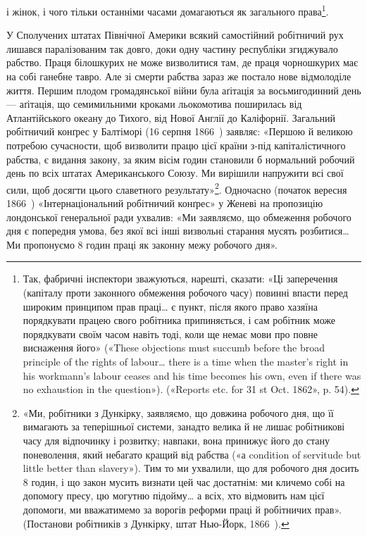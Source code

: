 і жінок, і чого тільки останніми часами домагаються як
загального права\footnote{
Так, фабричні інспектори зважуються, нарешті, сказати: «Ці
заперечення (капіталу проти законного обмеження робочого часу) повинні
впасти перед широким принципом прав праці\dots{} є пункт, після якого право
хазяїна порядкувати працею свого робітника припиняється, і сам робітник
може порядкувати своїм часом навіть тоді, коли ще немає мови про повне
виснаження його» («These objections must succumb before the broad
principle of the rights of labour\dots{} there is a time when the master’s right
in his workmann’s labour ceases and his time becomes his own, even if
there was no exhaustion in the question»). («Reports etc. for 31 st Oct.
1862», p. 54).
}.

У Сполучених штатах Північної Америки всякий самостійний
робітничий рух лишався паралізованим так довго, доки
одну частину республіки згиджувало рабство. Праця білошкурих
не може визволитися там, де праця чорношкурих має на собі
ганебне тавро. Але зі смерти рабства зараз же постало нове відмолоділе
життя. Першим плодом громадянської війни була аґітація
за восьмигодинний день — аґітація, що семимильними
кроками льокомотива поширилась від Атлантійського океану до
Тихого, від Нової Англії до Каліфорнії. Загальний робітничий
конґрес у Балтіморі (16 серпня 1866~) заявляє: «Першою й
великою потребою сучасности, щоб визволити працю цієї країни
з-під капіталістичного рабства, є видання закону, за яким вісім
годин становили б нормальний робочий день по всіх штатах Американського
Союзу. Ми вирішили напружити всі свої сили, щоб
досягти цього славетного результату»\footnote{
«Ми, робітники з Дункірку, заявляємо, що довжина робочого
дня, що її вимагають за теперішньої системи, занадто велика й не лишає
робітникові часу для відпочинку і розвитку; навпаки, вона принижує
його до стану поневолення, який небагато кращий від рабства («а condition
of servitude but little better than slavery»). Тим то ми ухвалили, що
для робочого дня досить 8 годин, і що закон мусить визнати цей час достатнім:
ми кличемо собі на допомогу пресу, цю могутню підойму\dots{} а
всіх, хто відмовить нам цієї допомоги, ми вважатимемо за ворогів реформи
праці й робітничих прав». (Постанови робітників з Дункірку, штат
Нью-Йорк, 1866~).
}. Одночасно (початок
вересня 1866~) «Інтернаціональний робітничий конґрес» у Женеві
на пропозицію лондонської генеральної ради ухвалив: «Ми
заявляємо, що обмеження робочого дня є попередня умова, без
якої всі інші визвольні старання мусять розбитися\dots{} Ми пропонуємо
8 годин праці як законну межу робочого дня».

